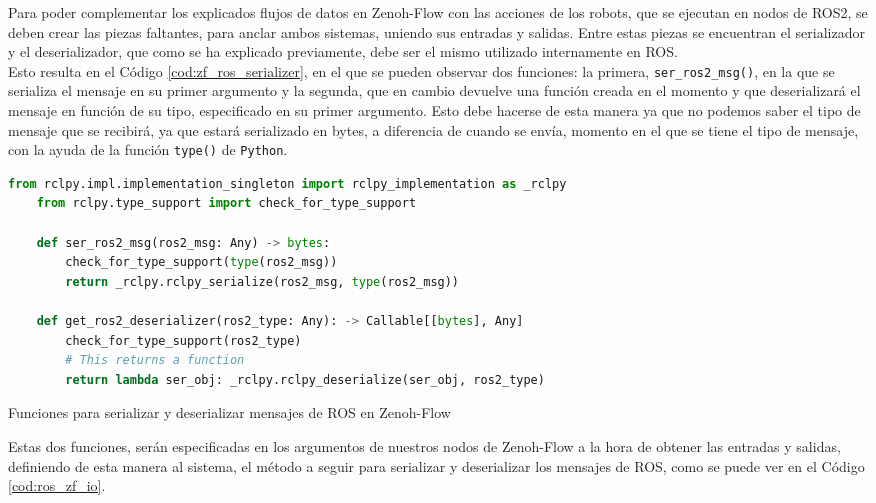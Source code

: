 Para poder complementar los explicados flujos de datos en Zenoh-Flow con las
acciones de los robots, que se ejecutan en nodos de ROS2, se deben crear las
piezas faltantes, para anclar ambos sistemas, uniendo sus entradas y salidas.
Entre estas piezas se encuentran el serializador y el deserializador, que como
se ha explicado previamente, debe ser el mismo utilizado internamente en ROS.
\\

Esto resulta en el Código \ref{cod:zf_ros_serializer}, en el que se pueden
observar dos funciones: la primera, \verb|ser_ros2_msg()|, en la que se
serializa el mensaje en su primer argumento y la segunda, que en cambio devuelve
una función creada en el momento y que deserializará el mensaje en función de su
tipo, especificado en su primer argumento.
Esto debe hacerse de esta manera ya que no podemos saber el tipo de mensaje que
se recibirá, ya que estará serializado en bytes, a diferencia de cuando se
envía, momento en el que se tiene el tipo de mensaje, con la ayuda de la función
\verb|type()| de \texttt{Python}.
\\

\begin{code}[H]
  \begin{lstlisting}[language=Python]
    from rclpy.impl.implementation_singleton import rclpy_implementation as _rclpy
    from rclpy.type_support import check_for_type_support

    def ser_ros2_msg(ros2_msg: Any) -> bytes:
        check_for_type_support(type(ros2_msg))
        return _rclpy.rclpy_serialize(ros2_msg, type(ros2_msg))

    def get_ros2_deserializer(ros2_type: Any): -> Callable[[bytes], Any]
        check_for_type_support(ros2_type)
        # This returns a function
        return lambda ser_obj: _rclpy.rclpy_deserialize(ser_obj, ros2_type)
  \end{lstlisting}
\caption[Funciones para serializar y deserializar mensajes de ROS en Zenoh-Flow]{Funciones para serializar y deserializar mensajes de ROS en Zenoh-Flow}
\label{cod:zf_ros_serializer}
\end{code}

Estas dos funciones, serán especificadas en los argumentos de nuestros nodos de
Zenoh-Flow a la hora de obtener las entradas y salidas, definiendo de esta
manera al sistema, el método a seguir para serializar y deserializar los
mensajes de ROS, como se puede ver en el Código \ref{cod:ros_zf_io}.
\\

